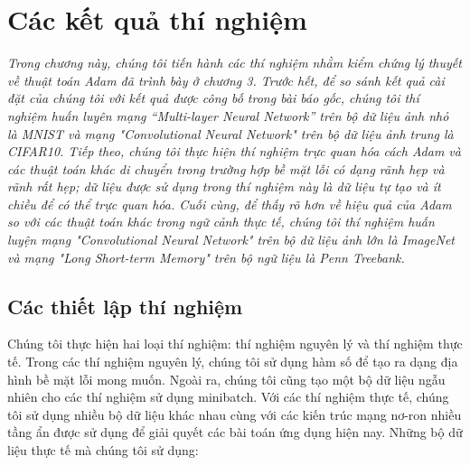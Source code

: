\chapter{Các kết quả thí nghiệm}
\label{Chapter4}

\textit{Trong chương này, chúng tôi tiến hành các thí nghiệm nhằm kiểm chứng lý thuyết về thuật toán Adam đã trình bày ở chương 3. Trước hết, để so sánh kết quả cài đặt của chúng tôi với kết quả được công bố trong bài báo gốc, chúng tôi thí nghiệm huấn luyên mạng “Multi-layer Neural Network” trên bộ dữ liệu ảnh nhỏ là MNIST và mạng "Convolutional Neural Network" trên bộ dữ liệu ảnh trung là CIFAR10. Tiếp theo, chúng tôi thực hiện thí nghiệm trực quan hóa cách Adam và các thuật toán khác di chuyển trong trường hợp bề mặt lỗi có dạng rãnh hẹp và rãnh rất hẹp; dữ liệu được sử dụng trong thí nghiệm này là dữ liệu tự tạo và ít chiều để có thể trực quan hóa. Cuối cùng, để thấy rõ hơn về hiệu quả của Adam so với các thuật toán khác trong ngữ cảnh thực tế, chúng tôi thí nghiệm huấn luyện mạng "Convolutional Neural Network" trên bộ dữ liệu ảnh lớn là ImageNet và mạng "Long Short-term Memory" trên bộ ngữ liệu là Penn Treebank.}

\section{Các thiết lập thí nghiệm}

Chúng tôi thực hiện hai loại thí nghiệm: thí nghiệm nguyên lý và thí nghiệm thực tế. Trong các thí nghiệm nguyên lý, chúng tôi sử dụng hàm số để tạo ra dạng địa hình bề mặt lỗi mong muốn. Ngoài ra, chúng tôi cũng tạo một bộ dữ liệu ngẫu nhiên cho các thí nghiệm sử dụng minibatch. Với các thí nghiệm thực tế, chúng tôi sử dụng nhiều bộ dữ liệu khác nhau cùng với các kiến trúc mạng nơ-ron nhiều tầng ẩn được sử dụng để giải quyết các bài toán ứng dụng hiện nay. Những bộ dữ liệu thực tế mà chúng tôi sử dụng:

